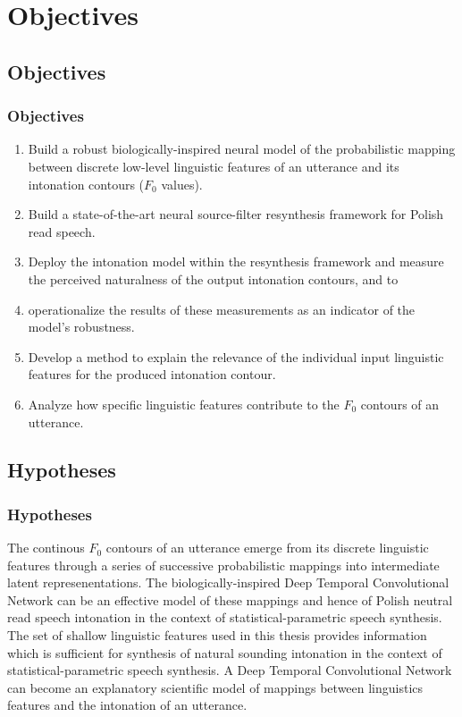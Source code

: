 \documentclass[a4paper,9pt]{beamer}
\theoremstyle{mytheoremstyle}
\newenvironment{hypothesis}[1]
  {\renewcommand\theinnerhypothesis{#1}\innerhypothesis}
  {\endinnerhypothesis}
\begin{document}
\section{Objectives}
\subsection{Objectives}
\begin{frame}
\frametitle{Objectives}
\begin{enumerate}
\item<1-2> Build a robust biologically-inspired neural model of the probabilistic mapping between discrete low-level linguistic features of an utterance and its intonation contours ($F_{0}$ values).
\item<2> Build a state-of-the-art neural source-filter resynthesis framework for Polish read speech.
\item<2> Deploy the intonation model within the resynthesis framework and measure the perceived naturalness of the output intonation contours, and to
\item<2> operationalize the results of these measurements as an indicator of the model's robustness.
\item<2> Develop a method to explain the relevance of the individual input linguistic features for the produced intonation contour.
\item<1-2> Analyze how specific linguistic features contribute to the $F_{0}$ contours of an utterance.
\end{enumerate}
\end{frame}

\subsection{Hypotheses}
\begin{frame}
\frametitle{Hypotheses}
\begin{tcolorbox}
\begin{hypothesis}{1} The continous $F_0$ contours of an utterance emerge from its discrete linguistic features through a series of successive probabilistic mappings into intermediate latent represenentations.
\end{hypothesis}
\begin{hypothesis}{2}
The biologically-inspired Deep Temporal Convolutional Network can be an effective model of these mappings and hence of Polish neutral read speech intonation in the context of statistical-parametric speech synthesis. 
\end{hypothesis}
\begin{hypothesis}{3}
The set of shallow linguistic features used in this thesis provides information which is sufficient for synthesis of natural sounding intonation in the context of statistical-parametric speech synthesis. 
\end{hypothesis}
\begin{hypothesis}{4}
A Deep Temporal Convolutional Network can become an explanatory scientific model of mappings between linguistics features and the intonation of an utterance.
\end{hypothesis}
\end{tcolorbox}
\end{frame}
\end{document}

